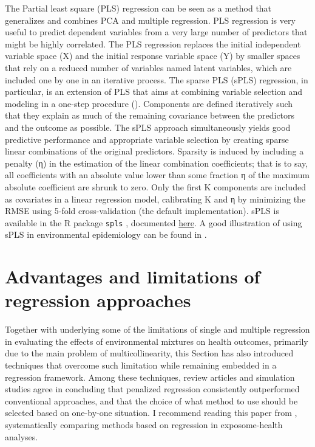 \documentclass[
]{book}
\begin{document}
The Partial least square (PLS) regression can be seen as a method that generalizes and combines PCA and multiple regression. PLS regression is very useful to predict dependent variables from a very large number of predictors that might be highly correlated. The PLS regression replaces the initial independent variable space (X) and the initial response variable space (Y) by smaller spaces that rely on a reduced number of variables named latent variables, which are included one by one in an iterative process. The sparse PLS (sPLS) regression, in particular, is an extension of PLS that aims at combining variable selection and modeling in a one-step procedure (\citet{le2008sparse}). Components are defined iteratively such that they explain as much of the remaining covariance between the predictors and the outcome as possible. The sPLS approach simultaneously yields good predictive performance and appropriate variable selection by creating sparse linear combinations of the original predictors. Sparsity is induced by including a penalty (η) in the estimation of the linear combination coefficients; that is to say, all coefficients with an absolute value lower than some fraction η of the maximum absolute coefficient are shrunk to zero. Only the first K components are included as covariates in a linear regression model, calibrating K and η by minimizing the RMSE using 5-fold cross-validation (the default implementation). sPLS is available in the R package \texttt{spls} , documented \href{https://cran.r-project.org/web/packages/spls/vignettes/spls-example.pdf}{here}. A good illustration of using sPLS in environmental epidemiology can be found in \citet{lenters2015phthalates}.

\hypertarget{advantages-and-limitations-of-regression-approaches}{%
\section{Advantages and limitations of regression approaches}\label{advantages-and-limitations-of-regression-approaches}}

Together with underlying some of the limitations of single and multiple regression in evaluating the effects of environmental mixtures on health outcomes, primarily due to the main problem of multicollinearity, this Section has also introduced techniques that overcome such limitation while remaining embedded in a regression framework. Among these techniques, review articles and simulation studies agree in concluding that penalized regression consistently outperformed conventional approaches, and that the choice of what method to use should be selected based on one-by-one situation. I recommend reading this paper from \citet{agier2016systematic}, systematically comparing methods based on regression in exposome-health analyses.
\end{document}
